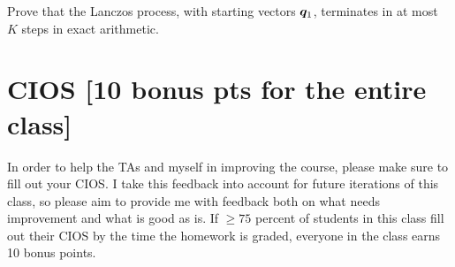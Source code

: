 \documentclass[twoside,10pt]{article}
\begin{document}
Prove that the Lanczos process, with starting vectors $\bm{q}_1$, terminates in at most $K$ steps in exact arithmetic. 

\section{CIOS [10 bonus pts for the entire class]}
  In order to help the TAs and myself in improving the course, please make sure to fill out your CIOS. 
  I take this feedback into account for future iterations of this class, so please aim to provide me with feedback both on what needs improvement and what is good as is. 
  If $\geq 75$ percent of students in this class fill out their CIOS by the time the homework is graded, everyone in the class earns 10 bonus points.
\end{document}
